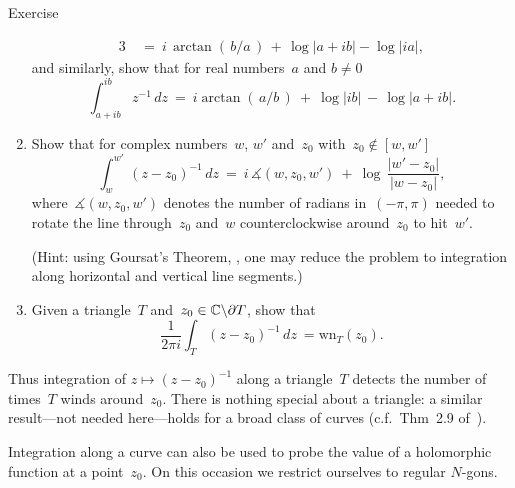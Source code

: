 \documentclass[a]{subfiles}
\begin{document}
\begin{parsec}
\begin{point}[invint]{Exercise}
\begin{enumerate}
\begin{alignat*}{3}
	\ &=\ 
	\textstyle
	i\,\arctan(\,b/a\,)
	\,+\, \log\left|a+ib\right| - \log\left|ia\right|,
\end{alignat*}
and similarly, show that for real numbers~$a$ and $b\neq 0$
\begin{equation*}
	\int_{a+ib}^{ib} z^{-1}\,dz
	\ = \ 
	i\arctan(\,a/b\,) \ +\ 
	\log\left|ib\right| \,-\,
	\log\left|a+ib\right|.
\end{equation*}
	\item
Show that for complex numbers~$w$, $w'$ and~$z_0$
with~$z_0\notin [w,w']$
\begin{equation*}
	\int_{w}^{w'}\,(z-z_0)^{-1}\,dz
\ = \ 
i\, \measuredangle(w,z_0,w')\ +\ 
\log\,\frac{\left|w'-z_0\right|}{\left|w-z_0\right|},
\end{equation*}
where~$\measuredangle(w,z_0,w')$
denotes
the number of radians
in~$(-\pi,\pi)$
needed
to rotate the line through~$z_0$ and~$w$
counterclockwise around~$z_0$ to hit~$w'$.

(Hint: 
using Goursat's Theorem, ,
one may reduce the problem
to integration along horizontal and vertical line segments.)
\item
Given a triangle~$T$ and~$z_0\in\mathbb{C}\backslash \partial T$,
show that
\begin{equation*}
	\frac{1}{2\pi i}\int_T (z-z_0)^{-1}\,dz
	\ =  \mathrm{wn}_T(z_0).
\end{equation*}
\end{enumerate}
\end{point}
\begin{point}%
Thus integration of 
$z\mapsto (z-z_0)^{-1}$
along a triangle~$T$ detects
the number of times~$T$ winds
around~$z_0$.
There is nothing special about a triangle:
a similar result---not needed here---holds
for a broad class of curves
(c.f.~Thm~2.9 of~\cite{conway2013}).

Integration along a curve can also be used
to probe the value of a holomorphic function at a point~$z_0$.
On this occasion
we restrict ourselves
to regular $N$-gons.
\end{point}
\end{parsec}%
\end{document}
